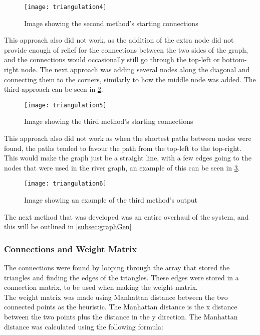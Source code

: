 \begin{figure}[H]
	\texttt{[image: triangulation4]}
	\centering
	\caption{Image showing the second method's starting connections}
	\label{fig:triangulation4}
\end{figure}
	
	This approach also did not work, as the addition of the extra node did not provide enough of relief for the connections between the two sides of the graph, and the connections would occasionally still go through the top-left or bottom-right node.
The next approach was adding several nodes along the diagonal and connecting them to the corners, similarly to how the middle node was added. The third approach can be seen in \ref{fig:triangulation5}.

\begin{figure}[H]
	\texttt{[image: triangulation5]}
	\centering
	\caption{Image showing the third method's starting connections}
	\label{fig:triangulation5}
\end{figure}
	
	This approach also did not work as when the shortest paths between nodes were found, the paths tended to favour the path from the top-left to the top-right. This would make the graph just be a straight line, with a few edges going to the nodes that were used in the river graph, an example of this can be seen in \ref{fig:triangulation6}.

\begin{figure}[H]
	\texttt{[image: triangulation6]}
	\centering
	\caption{Image showing an example of the third method's output}
	\label{fig:triangulation6}
\end{figure}

	The next method that was developed was an entire overhaul of the system, and this will be outlined in \ref{subsec:graphGen}

\subsubsection{Connections and Weight Matrix}
	The connections were found by looping through the array that stored the triangles and finding the edges of the triangles. These edges were stored in a connection matrix, to be used when making the weight matrix.\\
	The weight matrix was made using Manhattan distance between the two connected points as the heuristic. The Manhattan distance is the x distance between the two points plus the distance in the y direction. The Manhattan distance was calculated using the following formula:\\

